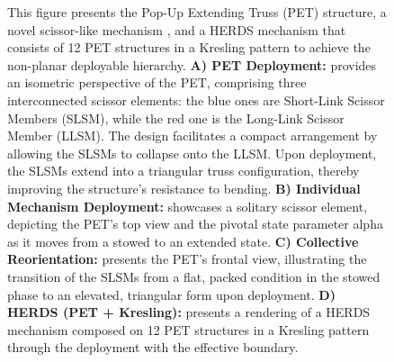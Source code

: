\begin{figure}
\caption{This figure presents the Pop-Up Extending Truss (PET) structure, a novel scissor-like mechanism {, and a HERDS mechanism that consists of 12 PET structures in a Kresling pattern to achieve the non-planar deployable hierarchy}. \textbf{A) PET Deployment:} provides an isometric perspective of the PET, comprising three interconnected scissor elements: the blue ones are Short-Link Scissor Members (SLSM), while the red one is the Long-Link Scissor Member (LLSM). The design facilitates a compact arrangement by allowing the SLSMs to collapse onto the LLSM. Upon deployment, the SLSMs extend into a triangular truss configuration, thereby improving the structure’s resistance to bending. \textbf{B) Individual Mechanism Deployment:} showcases a solitary scissor element, depicting the PET’s top view and the pivotal state parameter alpha as it moves from a stowed to an extended state. \textbf{C) Collective Reorientation:} presents the PET’s frontal view, illustrating the transition of the SLSMs from a flat, packed condition in the stowed phase to an elevated, triangular form upon deployment. {\textbf{D) HERDS (PET + Kresling):} presents a rendering of a HERDS mechanism composed on 12 PET structures in a Kresling pattern through the deployment with the effective boundary.}}\label{fig:PET_expansion}
\end{figure}

